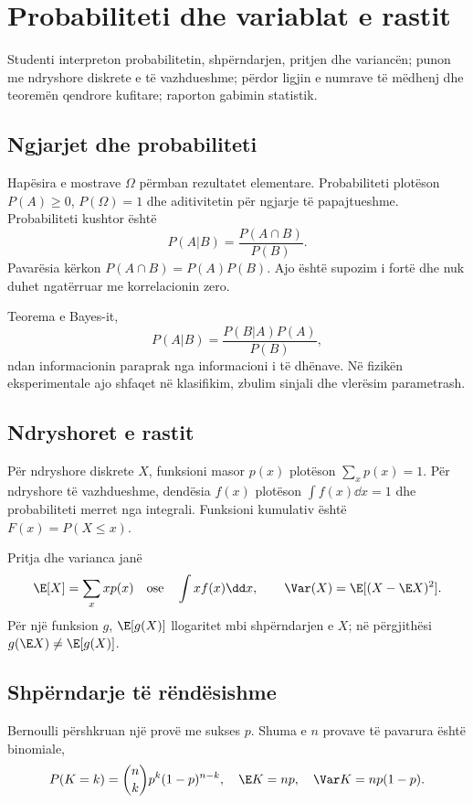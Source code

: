 \chapter{Probabiliteti dhe variablat e rastit}
\begin{qellime}
Studenti interpreton probabilitetin, shpërndarjen, pritjen dhe variancën; punon me ndryshore diskrete e të vazhdueshme; përdor ligjin e numrave të mëdhenj dhe teoremën qendrore kufitare; raporton gabimin statistik.
\end{qellime}

\section{Ngjarjet dhe probabiliteti}
Hapësira e mostrave $\Omega$ përmban rezultatet elementare. Probabiliteti plotëson $P(A)\ge0$, $P(\Omega)=1$ dhe aditivitetin për ngjarje të papajtueshme. Probabiliteti kushtor është
\begin{equation}
 P(A|B)=\frac{P(A\cap B)}{P(B)}.
\end{equation}
Pavarësia kërkon $P(A\cap B)=P(A)P(B)$. Ajo është supozim i fortë dhe nuk duhet ngatërruar me korrelacionin zero.

Teorema e Bayes-it,
\begin{equation}
 P(A|B)=\frac{P(B|A)P(A)}{P(B)},
\end{equation}
ndan informacionin paraprak nga informacioni i të dhënave. Në fizikën eksperimentale ajo shfaqet në klasifikim, zbulim sinjali dhe vlerësim parametrash.

\section{Ndryshoret e rastit}
Për ndryshore diskrete $X$, funksioni masor $p(x)$ plotëson $\sum_xp(x)=1$. Për ndryshore të vazhdueshme, dendësia $f(x)$ plotëson $\int f(x)\dd x=1$ dhe probabiliteti merret nga integrali. Funksioni kumulativ është $F(x)=P(X\le x)$.

Pritja dhe varianca janë
\begin{equation}
 \E[X]=\sum_xxp(x)\quad\text{ose}\quad\int xf(x)\dd x,
 \qquad \Var(X)=\E[(X-\E X)^2].
\end{equation}
Për një funksion $g$, $\E[g(X)]$ llogaritet mbi shpërndarjen e $X$; në përgjithësi $g(\E X)\ne\E[g(X)]$.

\section{Shpërndarje të rëndësishme}
Bernoulli përshkruan një provë me sukses $p$. Shuma e $n$ provave të pavarura është binomiale,
\begin{equation}
 P(K=k)=\binom nk p^k(1-p)^{n-k},\quad \E K=np,\quad \Var K=np(1-p).
\end{equation}


